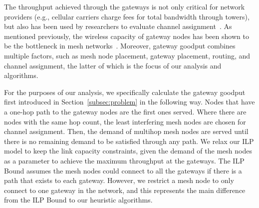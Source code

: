 

The throughput achieved through the gateways is not only critical for network providers (e.g., cellular
carriers charge fees for total bandwidth through towers), but also has been used by researchers
to evaluate channel assignment~\cite{avallone2008channel}.  As mentioned previously, the wireless
capacity of gateway nodes has been shown to be the bottleneck in mesh networks~\cite{robinson2010deploying}.
Moreover, gateway goodput combines multiple factors, such as mesh node placement, gateway placement, 
routing, and channel assignment, the latter of which is the focus of our analysis and algorithms. 

For the purposes of our analysis, we specifically calculate the gateway goodput first introduced 
in Section~\ref{subsec:problem} in the following way.  Nodes that have a one-hop path to the gateway
nodes are the first ones served. Where there are nodes with the same hop count, the least interfering
mesh nodes are chosen for channel assignment. Then, the demand of multihop mesh nodes are served 
until there is no remaining demand to be satisfied through any path.
We relax our ILP model to keep the link capacity constraints, given the demand of the mesh nodes as a
parameter to achieve the maximum throughput at the gateways. The ILP Bound assumes the mesh 
nodes could connect to all the gateways if there is a path that exists to each gateway. However,
we restrict a mesh node to only connect to one gateway in the network, and this represents the
main difference from the ILP Bound to our heuristic algorithms.


